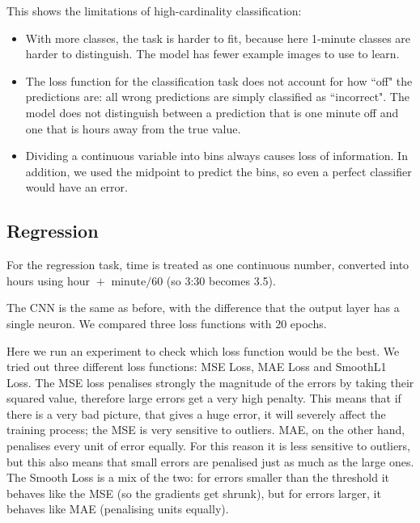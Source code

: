 \documentclass[a4paper]{article}
\begin{document}
This shows the limitations of high-cardinality classification:
\begin{itemize}
	\item With more classes, the task is harder to fit, because here 1-minute classes are harder to distinguish. The model has fewer example images to use to learn.
	\item The loss function for the classification task does not account for how ``off" the predictions are: all wrong predictions are simply classified as ``incorrect". The model does not distinguish between a prediction that is one minute off and one that is hours away from the true value. 
	\item Dividing a continuous variable into bins always causes loss of information. In addition, we used the midpoint to predict the bins, so even a perfect classifier would have an error. 
\end{itemize}

\subsection{Regression}

For the regression task, time is treated as one continuous number, converted into hours using \(\text{hour }+\text{ minute}/60\) (so 3:30 becomes 3.5). 

The CNN is the same as before, with the difference that the output layer has a single neuron. We compared three loss functions with 20 epochs.


Here we run an experiment to check which loss function would be the best. We tried out three different loss functions: MSE Loss, MAE Loss and SmoothL1 Loss. The MSE loss penalises strongly the magnitude of the errors by taking their squared value, therefore large errors get a very high penalty. This means that if there is a very bad picture, that gives a huge error, it will severely affect
the training process; the MSE is very sensitive to outliers. MAE, on the other hand, penalises every unit of error equally.
For this reason it is less sensitive to outliers, but this also means that small errors are penalised just as much as the large ones.
The Smooth Loss is a mix of the two: for errors smaller than the threshold it behaves like the MSE (so the gradients get shrunk), 
but for errors larger, it behaves like MAE (penalising units equally).
\end{document}
